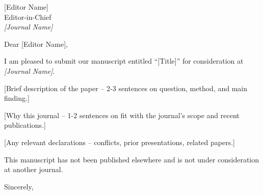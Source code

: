 \documentclass[12pt]{letter}
\begin{document}
\begin{letter}{[Editor Name] \\ Editor-in-Chief \\ \textit{[Journal Name]}}

\opening{Dear [Editor Name],}

I am pleased to submit our manuscript entitled ``[Title]'' for consideration at \textit{[Journal Name]}.

[Brief description of the paper -- 2-3 sentences on question, method, and main finding.]

[Why this journal -- 1-2 sentences on fit with the journal's scope and recent publications.]

[Any relevant declarations -- conflicts, prior presentations, related papers.]

This manuscript has not been published elsewhere and is not under consideration at another journal.

\closing{Sincerely,}

\end{letter}
\end{document}
